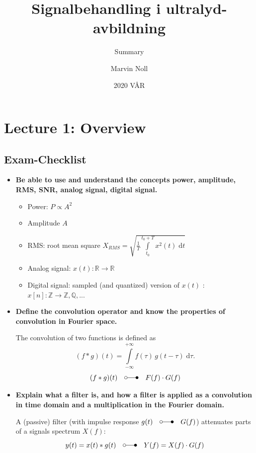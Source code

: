 \documentclass[10pt,a4paper,noendnumber=true]{scrartcl}
\title{Signalbehandling i ultralyd-avbildning}
\subtitle{Summary}
\author{Marvin Noll}
\date{2020 VÅR}
\begin{document}
\maketitle

\section{Lecture 1: Overview}

\subsection{Exam-Checklist}
\begin{itemize}
\item \textbf{Be able to use and understand the concepts power, amplitude, RMS, SNR, analog signal, digital signal.}

\begin{itemize}
\item Power: $P\propto A^2$
\item Amplitude $A$
\item RMS: root mean square $X_{RMS}=\sqrt{\frac{1}{T} \int\limits_{t_0}^{t_0+T} x^2(t)\; \text{d}t}$
\item Analog signal: $x(t) : \mathbb{R} \rightarrow \mathbb{R} $
\item Digital signal: sampled (and quantized) version of $x(t)$ : $x[n] : \mathbb{Z} \rightarrow \mathbb{Z},\mathbb{Q},...$
\end{itemize}

\item \textbf{Define the convolution operator and know the properties of convolution in Fourier space.}

The convolution of two functions is defined as
\begin{equation}
(f \ast g)(t) = \int\limits_{-\infty}^{+\infty} f(\tau)\,g(t-\tau)\;\text{d}\tau.
\end{equation}
\begin{equation}
(f \ast g)(t) \quad\laplace\quad F(f) \cdot G(f)
\end{equation}

\item \textbf{Explain what a filter is, and how a filter is applied as a convolution in time domain and a multiplication in the Fourier domain.}

A (passive) filter (with impulse response $g(t) \quad\laplace\quad G(f)$) attenuates parts of a signals spectrum $X(f)$:
\begin{equation}
y(t) = x(t) \ast g(t) \quad\laplace\quad Y(f) = X(f) \cdot G(f)
\end{equation}


\end{itemize}
\end{document}
